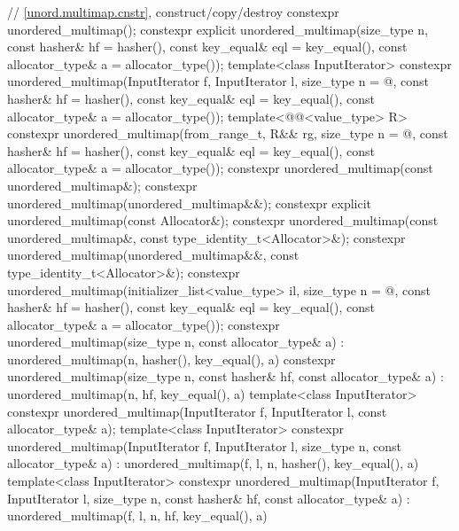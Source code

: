 \begin{codeblock}
{{    // \ref{unord.multimap.cnstr}, construct/copy/destroy
    constexpr unordered_multimap();
    constexpr explicit unordered_multimap(size_type n, const hasher& hf = hasher(),
                                          const key_equal& eql = key_equal(),
                                          const allocator_type& a = allocator_type());
    template<class InputIterator>
      constexpr unordered_multimap(InputIterator f, InputIterator l,
                                   size_type n = @\seebelow@, const hasher& hf = hasher(),
                                   const key_equal& eql = key_equal(),
                                   const allocator_type& a = allocator_type());
    template<@@<value_type> R>
      constexpr unordered_multimap(from_range_t, R&& rg,
                                   size_type n = @\seebelow@, const hasher& hf = hasher(),
                                   const key_equal& eql = key_equal(),
                                   const allocator_type& a = allocator_type());
    constexpr unordered_multimap(const unordered_multimap&);
    constexpr unordered_multimap(unordered_multimap&&);
    constexpr explicit unordered_multimap(const Allocator&);
    constexpr unordered_multimap(const unordered_multimap&, const type_identity_t<Allocator>&);
    constexpr unordered_multimap(unordered_multimap&&, const type_identity_t<Allocator>&);
    constexpr unordered_multimap(initializer_list<value_type> il,
                                 size_type n = @\seebelow@, const hasher& hf = hasher(),
                                 const key_equal& eql = key_equal(),
                                 const allocator_type& a = allocator_type());
    constexpr unordered_multimap(size_type n, const allocator_type& a)
      : unordered_multimap(n, hasher(), key_equal(), a) { }
    constexpr unordered_multimap(size_type n, const hasher& hf, const allocator_type& a)
      : unordered_multimap(n, hf, key_equal(), a) { }
    template<class InputIterator>
      constexpr unordered_multimap(InputIterator f, InputIterator l, const allocator_type& a);
    template<class InputIterator>
      constexpr unordered_multimap(InputIterator f, InputIterator l, size_type n,
                                   const allocator_type& a)
        : unordered_multimap(f, l, n, hasher(), key_equal(), a) { }
    template<class InputIterator>
      constexpr unordered_multimap(InputIterator f, InputIterator l, size_type n,
                                   const hasher& hf, const allocator_type& a)
        : unordered_multimap(f, l, n, hf, key_equal(), a) { }
}}
\end{codeblock}
